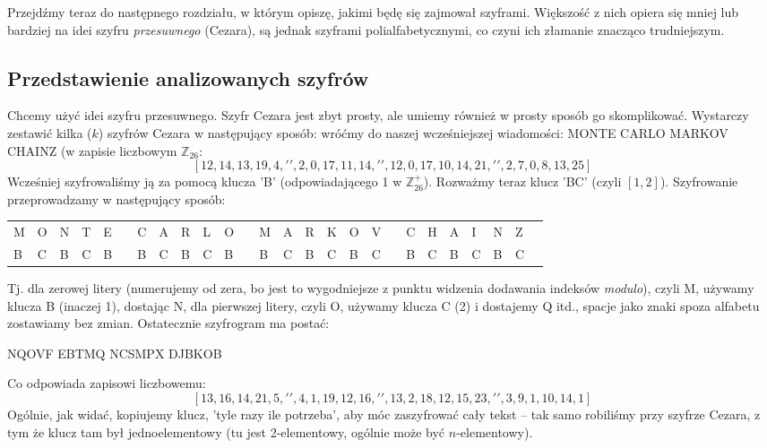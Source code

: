 \documentclass[a4paper]{article}
\theoremstyle{defn}
\theoremstyle{theorem}
\theoremstyle{lemma}
\theoremstyle{cor}
\theoremstyle{fact}
\begin{document}
Przejdźmy teraz do następnego rozdziału, w którym opiszę, jakimi będę się zajmował szyframi. Większość z nich opiera się mniej lub bardziej na idei szyfru \textit{przesuwnego} (Cezara), są jednak szyframi polialfabetycznymi, co czyni ich złamanie znacząco trudniejszym.\\

\subsection{Przedstawienie analizowanych szyfrów}
Chcemy użyć idei szyfru przesuwnego. Szyfr Cezara jest zbyt prosty, ale umiemy również w prosty sposób go skomplikować. Wystarczy zestawić kilka ($k$) szyfrów Cezara w następujący sposób:
wróćmy do naszej wcześniejszej wiadomości: MONTE CARLO MARKOV CHAINZ (w zapisie liczbowym $\mathbb{Z}_{26}$:
$$[12, 14, 13, 19, 4, ' ', 2, 0, 17, 11, 14, ' ', 12, 0, 17, 10, 14, 21, ' ', 2, 7, 0, 8, 13, 25]$$
Wcześniej szyfrowaliśmy ją za pomocą klucza 'B' (odpowiadającego 1 w $\mathbb{Z}_{26}^+$). Rozważmy teraz klucz 'BC' (czyli $[1, 2]$). Szyfrowanie przeprowadzamy w następujący sposób:
\begin{center}\begin{tabular}{|p{1.5mm}|p{1.5mm}|p{1.5mm}|p{1.5mm}|p{1.5mm}|p{1.5mm}|p{1.5mm}|p{1.5mm}|p{1.5mm}|p{1.5mm}|p{1.5mm}|p{1.5mm}|p{1.5mm}|p{1.5mm}|p{1.5mm}|p{1.5mm}|p{1.5mm}|p{1.5mm}|p{1.5mm}|p{1.5mm}|p{1.5mm}|p{1.5mm}|p{1.5mm}|p{1.5mm}|p{1.5mm}|p{1.5mm}|}
    M & O & N & T & E & & C & A & R & L & O & & M & A & R & K & O & V & & C & H & A & I & N & Z \\
    B & C & B & C & B & & B & C & B & C & B & & B & C & B & C & B & C & & B & C & B & C & B & C
\end{tabular}
\end{center}
Tj. dla zerowej litery (numerujemy od zera, bo jest to wygodniejsze z punktu widzenia dodawania indeksów \textit{modulo}), czyli M, używamy klucza B (inaczej 1), dostając N, dla pierwszej litery, czyli O, używamy klucza C (2) i dostajemy Q itd., spacje jako znaki spoza alfabetu zostawiamy bez zmian. Ostatecznie szyfrogram ma postać:
\begin{center}
    NQOVF EBTMQ NCSMPX DJBKOB
\end{center}
Co odpowiada zapisowi liczbowemu:
$$ [13, 16, 14, 21, 5, ' ', 4, 1, 19, 12, 16, ' ', 13, 2, 18, 12, 15, 23, ' ', 3, 9, 1, 10, 14, 1]$$
Ogólnie, jak widać, kopiujemy klucz, 'tyle razy ile potrzeba', aby móc zaszyfrować cały tekst – tak samo robiliśmy przy szyfrze Cezara, z tym że klucz tam był jednoelementowy (tu jest 2-elementowy, ogólnie może być $n$-elementowy).\\\\
\end{document}
